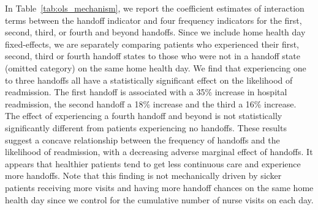 \documentclass[final,12pt, notitlepage]{article}
\begin{document}
In Table~\ref{tab:ols_mechanism}, we report the coefficient estimates of interaction terms between the handoff indicator and four frequency indicators for the first, second, third, or fourth and beyond handoffs.
Since we include home health day fixed-effects, we are separately comparing patients who experienced their first, second, third or fourth handoff states to those who were not in a handoff state (omitted category) on the same home health day.
We find that experiencing one to three handoffs all have a statistically significant effect on the likelihood of readmission. The first handoff is associated with a 35\% increase in hospital readmission, the second handoff a 18\% increase and the third a 16\% increase.
The effect of experiencing a fourth handoff and beyond is not statistically significantly different from patients experiencing no handoffs.
These results suggest a concave relationship between the frequency of handoffs and the likelihood of readmission, with a decreasing adverse marginal effect of handoffs. It appears that healthier patients tend to get less continuous care and experience more handoffs.
Note that this finding is not mechanically driven by sicker patients receiving more visits and having more handoff chances on the same home health day since we control for the cumulative number of nurse visits on each day.
\end{document}
